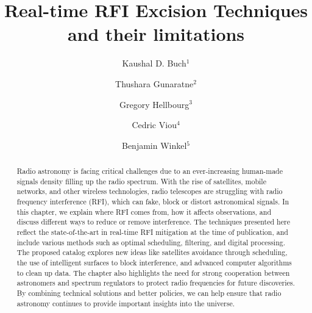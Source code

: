 \documentclass{iau_FM}
\title[chapter:hardware] {Real-time RFI Excision Techniques and their limitations}
\author[Buch, Gunaratne, Hellbourg, Viou and Winkel]   %
{
 Kaushal D. Buch$^1$
 \and Thushara Gunaratne$^2$
 \and Gregory Hellbourg$^3$
 \and Cedric Viou$^4$
 \and Benjamin Winkel$^5$
}
\affiliation{
$^1$ Giant Metrewave Radio Telescope, NCRA-TIFR, Pune, India \\ email: {\tt kdbuch@gmrt.ncra.tifr.res.in}\\[\affilskip]
$^2$ Herzberg Astronomy and Astrophysics Research Center, National Research Council Canada \\ email: {\tt Thushara.Gunaratne@nrc-cnrc.gc.ca} \\[\affilskip]
$^3$ California Institute of Technology, Pasadena, CA, USA \\ email: {\tt ghellbourg@astro.caltech.edu}\\[\affilskip]
$^4$ Observatoire Radioastronomique de Nançay (ORN), Observatoire de Paris, Université PSL, Université d'Orléans, CNRS, Nançay, France \\ email: {\tt Cedric.Viou@obs-nancay.fr} \\[\affilskip]
$^5$ Max-Planck-Institut für Radioastronomie - Effelsberg radio observatory \\ email: {\tt bwinkel@mpifr-bonn.mpg.de} \\[\affilskip]
}
\begin{document}
\maketitle

\begin{abstract}
Radio astronomy is facing critical challenges due to an ever-increasing human-made signals density filling up the radio spectrum. With the rise of satellites, mobile networks, and other wireless technologies, radio telescopes are struggling with radio frequency interference (RFI), which can fake, block or distort astronomical signals. In this chapter, we explain where RFI comes from, how it affects observations, and discuss different ways to reduce or remove interference. The techniques presented here reflect the state-of-the-art in real-time RFI mitigation at the time of publication, and include various methods such as optimal scheduling, filtering, and digital processing. The proposed catalog explores new ideas like satellites avoidance through scheduling, the use of intelligent surfaces to block interference, and advanced computer algorithms to clean up data. The chapter also highlights the need for strong cooperation between astronomers and spectrum regulators to protect radio frequencies for future discoveries. By combining technical solutions and better policies, we can help ensure that radio astronomy continues to provide important insights into the universe.
\end{abstract}












%

\end{document}
